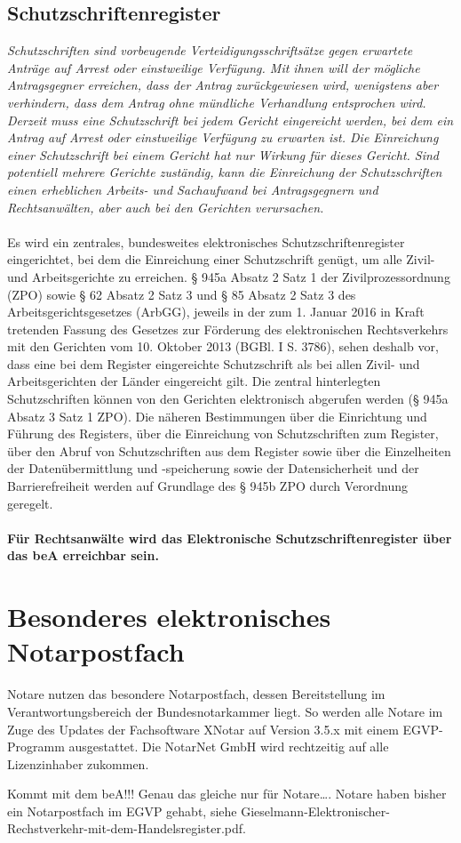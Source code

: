 \subsection{Schutzschriftenregister}
\textit{Schutzschriften sind vorbeugende Verteidigungsschriftsätze gegen erwartete Anträge auf Arrest oder einstweilige Verfügung. Mit ihnen will der mögliche Antragsgegner erreichen, dass der Antrag zurückgewiesen wird, wenigstens aber verhindern, dass dem Antrag ohne mündliche Verhandlung entsprochen wird. Derzeit muss eine Schutzschrift bei jedem Gericht eingereicht werden, bei dem ein Antrag auf Arrest oder einstweilige Verfügung zu erwarten ist. Die Einreichung einer Schutzschrift bei einem Gericht hat nur Wirkung für dieses Gericht. Sind potentiell mehrere Gerichte zuständig, kann die Einreichung der Schutzschriften einen erheblichen Arbeits- und Sachaufwand bei Antragsgegnern und Rechtsanwälten, aber auch bei den Gerichten verursachen. } \\\\

Es wird ein zentrales, bundesweites elektronisches Schutzschriftenregister eingerichtet, bei dem die Einreichung einer Schutzschrift genügt, um alle Zivil- und Arbeitsgerichte zu erreichen. § 945a Absatz 2 Satz 1 der Zivilprozessordnung (ZPO) sowie § 62 Absatz 2 Satz 3 und § 85 Absatz 2 Satz 3 des Arbeitsgerichtsgesetzes (ArbGG), jeweils in der zum 1. Januar 2016 in Kraft tretenden Fassung des Gesetzes zur Förderung des elektronischen Rechtsverkehrs mit den Gerichten vom 10. Oktober 2013 (BGBl. I S. 3786), sehen deshalb vor, dass eine bei dem Register eingereichte Schutzschrift als bei allen Zivil- und Arbeitsgerichten der Länder eingereicht gilt. Die zentral hinterlegten Schutzschriften können von den Gerichten elektronisch abgerufen werden (§ 945a Absatz 3 Satz 1 ZPO). Die näheren Bestimmungen über die Einrichtung und Führung des Registers, über die Einreichung von Schutzschriften zum Register, über den Abruf von Schutzschriften aus dem Register sowie über die Einzelheiten der Datenübermittlung und -speicherung sowie der Datensicherheit und der Barrierefreiheit werden auf Grundlage des § 945b ZPO durch Verordnung geregelt.\\\\

\textbf{Für Rechtsanwälte wird das Elektronische Schutzschriftenregister über das beA erreichbar sein.}

\section{Besonderes elektronisches Notarpostfach}
Notare nutzen das besondere Notarpostfach, dessen Bereitstellung im Verantwortungsbereich der Bundesnotarkammer liegt. So werden alle Notare im Zuge des Updates der Fachsoftware XNotar auf Version 3.5.x mit einem EGVP-Programm ausgestattet. Die NotarNet GmbH wird rechtzeitig auf alle Lizenzinhaber zukommen.

Kommt mit dem beA!!! Genau das gleiche nur für Notare….
Notare haben bisher ein Notarpostfach im EGVP gehabt, siehe Gieselmann-Elektronischer-Rechstverkehr-mit-dem-Handelsregister.pdf.